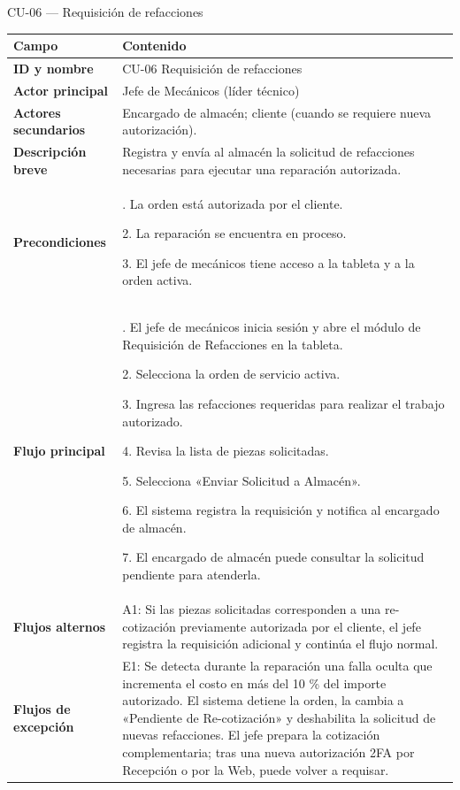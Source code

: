 CU-06 --- Requisición de refacciones

{\def\LTcaptype{none} %
\begin{longtable}[]{@{}
  >{\raggedright\arraybackslash}p{}
  >{\raggedright\arraybackslash}p{}@{}}
\toprule\noalign{}
\begin{minipage}[b]{\linewidth}\raggedright
\textbf{Campo}
\end{minipage} & \begin{minipage}[b]{\linewidth}\raggedright
\textbf{Contenido}
\end{minipage} \\
\midrule\noalign{}
\endhead
\bottomrule\noalign{}
\endlastfoot
\textbf{ID y nombre} & CU-06 Requisición de refacciones \\
\textbf{Actor principal} & Jefe de Mecánicos (líder técnico) \\
\textbf{Actores secundarios} & Encargado de almacén; cliente (cuando se
requiere nueva autorización). \\
\textbf{Descripción breve} & Registra y envía al almacén la solicitud de
refacciones necesarias para ejecutar una reparación autorizada. \\
\textbf{Precondiciones} & 1. La orden está autorizada por el cliente.

2. La reparación se encuentra en proceso.

3. El jefe de mecánicos tiene acceso a la tableta y a la orden
activa. \\
\textbf{Flujo principal} & 1. El jefe de mecánicos inicia sesión y abre
el módulo de Requisición de Refacciones en la tableta.

2. Selecciona la orden de servicio activa.

3. Ingresa las refacciones requeridas para realizar el trabajo
autorizado.

4. Revisa la lista de piezas solicitadas.

5. Selecciona «Enviar Solicitud a Almacén».

6. El sistema registra la requisición y notifica al encargado de
almacén.

7. El encargado de almacén puede consultar la solicitud pendiente para
atenderla. \\
\textbf{Flujos alternos} & A1: Si las piezas solicitadas corresponden a
una re-cotización previamente autorizada por el cliente, el jefe
registra la requisición adicional y continúa el flujo normal. \\
\textbf{Flujos de excepción} & E1: Se detecta durante la reparación una
falla oculta que incrementa el costo en más del 10 \% del importe
autorizado. El sistema detiene la orden, la cambia a «Pendiente de
Re-cotización» y deshabilita la solicitud de nuevas refacciones. El jefe
prepara la cotización complementaria; tras una nueva autorización 2FA
por Recepción o por la Web, puede volver a requisar.


\end{longtable}}
